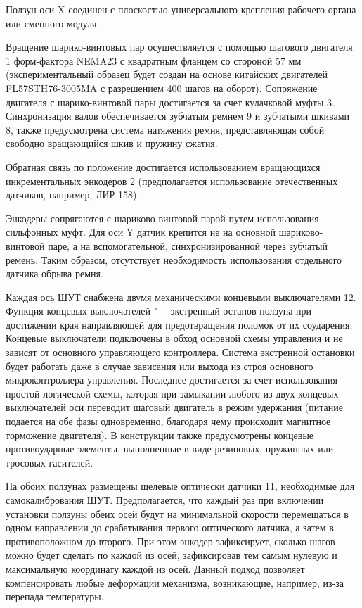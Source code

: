 Ползун оси X соединен с плоскостью универсального крепления рабочего органа или сменного модуля.

Вращение шарико-винтовых пар осуществляется с помощью шагового двигателя 1 форм-фактора NEMA23 с квадратным фланцем со стороной 57 мм (экспериментальный образец будет создан на основе китайских двигателей FL57STH76-3005MA с разрешением 400 шагов на оборот). Сопряжение двигателя с шарико-винтовой пары достигается за счет кулачковой муфты 3. Синхронизация валов обеспечивается зубчатым ремнем 9 и зубчатыми шкивами 8, также предусмотрена система натяжения ремня, представляющая собой свободно вращающийся шкив и пружину сжатия.

Обратная связь по положение достигается использованием вращающихся инкрементальных энкодеров 2 (предполагается использование отечественных датчиков, например, ЛИР-158).

Энкодеры сопрягаются с шариково-винтовой парой путем использования сильфонных муфт. Для оси Y датчик крепится не на основной шариково-винтовой паре, а на вспомогательной, синхронизированной через зубчатый ремень. Таким образом, отсутствует необходимость использования отдельного датчика обрыва ремня. 

Каждая ось ШУТ снабжена двумя механическими концевыми выключателями 12. Функция концевых выключателей "--- экстренный останов ползуна при достижении края направляющей для предотвращения поломок от их соударения. Концевые выключатели подключены в обход основной схемы управления и не зависят от основного управляющего контроллера. Система экстренной остановки будет работать даже в случае зависания или выхода из строя основного микроконтроллера управления. Последнее достигается за счет использования простой логической схемы, которая при замыкании любого из двух концевых выключателей оси переводит шаговый двигатель в режим удержания (питание подается на обе фазы одновременно, благодаря чему происходит магнитное торможение двигателя). В конструкции также предусмотрены концевые противоударные элементы, выполненные в виде резиновых, пружинных или тросовых гасителей.

На обоих ползунах размещены щелевые оптически датчики 11, необходимые для самокалибрования ШУТ. Предполагается, что каждый раз при включении установки ползуны обеих осей будут на минимальной скорости перемещаться в одном направлении до срабатывания первого оптического датчика, а затем в противоположном до второго. При этом энкодер зафиксирует, сколько шагов можно будет сделать по каждой из осей, зафиксировав тем самым нулевую и максимальную координату каждой из осей. Данный подход позволяет компенсировать любые деформации механизма, возникающие, например, из-за перепада температуры.


